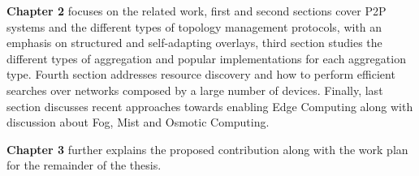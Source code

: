 \textbf{Chapter 2} focuses on the related work, first and second sections cover P2P systems and the different types of topology management protocols, with an emphasis on structured and self-adapting overlays, third section studies the different types of aggregation and popular implementations for each aggregation type. Fourth section addresses resource discovery and how to perform efficient searches over networks composed by a large number of devices. Finally, last section discusses recent approaches towards enabling Edge Computing along with discussion about Fog, Mist and Osmotic Computing.

\textbf{Chapter 3} further explains the proposed contribution along with the work plan for the remainder of the thesis. 

